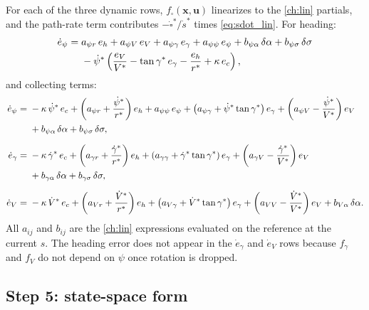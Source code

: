 \documentclass[11pt]{report}
\numberwithin{equation}{chapter}
\newcommand{\vb}[1]{\bm{#1}}
\newcommand{\sdot}{\dot s}
\begin{document}
For each of the three dynamic rows, $f_\square(\vb x,\vb u)$ linearizes to the
\cref{ch:lin} partials, and the path-rate term contributes $-\dot\square^*/\sdot^*$ times
\cref{eq:sdot_lin}. For heading:
\begin{align}
  \dot e_\psi ={}& a_{\psi r}\,e_h + a_{\psi V}\,e_V + a_{\psi\gamma}\,e_\gamma + a_{\psi\psi}\,e_\psi
       + b_{\psi\alpha}\,\delta\alpha + b_{\psi\sigma}\,\delta\sigma \notag\\
     & - \dot\psi^*\left(\frac{e_V}{V^*} - \tan\gamma^*\,e_\gamma - \frac{e_h}{r^*} + \kappa\,e_c\right),
\end{align}
and collecting terms:
\begin{align}
  \dot e_\psi ={}& -\kappa\,\dot\psi^*\,e_c
    + \left(a_{\psi r} + \frac{\dot\psi^*}{r^*}\right)e_h
    + a_{\psi\psi}\,e_\psi
    + \left(a_{\psi\gamma} + \dot\psi^*\tan\gamma^*\right)e_\gamma
    + \left(a_{\psi V} - \frac{\dot\psi^*}{V^*}\right)e_V \notag\\
   & + b_{\psi\alpha}\,\delta\alpha + b_{\psi\sigma}\,\delta\sigma, \\[6pt]
  \dot e_\gamma ={}& -\kappa\,\dot\gamma^*\,e_c
    + \left(a_{\gamma r} + \frac{\dot\gamma^*}{r^*}\right)e_h
    + \left(a_{\gamma\gamma} + \dot\gamma^*\tan\gamma^*\right)e_\gamma
    + \left(a_{\gamma V} - \frac{\dot\gamma^*}{V^*}\right)e_V \notag\\
   & + b_{\gamma\alpha}\,\delta\alpha + b_{\gamma\sigma}\,\delta\sigma, \\[6pt]
  \dot e_V ={}& -\kappa\,\dot V^*\,e_c
    + \left(a_{Vr} + \frac{\dot V^*}{r^*}\right)e_h
    + \left(a_{V\gamma} + \dot V^*\tan\gamma^*\right)e_\gamma
    + \left(a_{VV} - \frac{\dot V^*}{V^*}\right)e_V
    + b_{V\alpha}\,\delta\alpha .
\end{align}
All $a_{ij}$ and $b_{ij}$ are the \cref{ch:lin} expressions evaluated on the reference at
the current $s$. The heading error does not appear in the $\dot e_\gamma$ and $\dot e_V$ rows
because $f_\gamma$ and $f_V$ do not depend on $\psi$ once rotation is dropped.

\subsection*{Step 5: state-space form}
\end{document}
